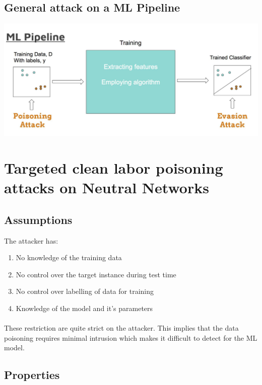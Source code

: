\documentclass[twoside]{article}
\begin{document}
\subsection{General attack on a ML Pipeline}
\includegraphics[scale=0.3]{MLpipeline.png}
\section{Targeted clean labor poisoning attacks on Neutral Networks}

\subsection{Assumptions}

The attacker has:
\begin{enumerate}
  \item No knowledge of the training data
  \item No control over the target instance during test time
  \item No control over labelling of data for training
  \item Knowledge of the model and it's parameters
\end{enumerate}
\paragraph{}
These restriction are quite strict on the attacker. This implies that the data poisoning requires minimal intrusion which makes it difficult to detect for the ML model.
\subsection{Properties}
\end{document}

